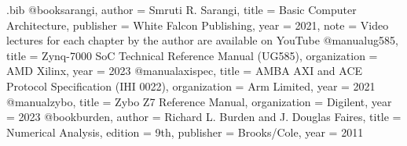 
\begin{filecontents*}[overwrite]{\jobname.bib}
@book{sarangi,
  author    = {Smruti R. Sarangi},
  title     = {Basic Computer Architecture},
  publisher = {White Falcon Publishing},
  year      = {2021},
  note      = {Video lectures for each chapter by the author are available on YouTube}
}
@manual{ug585,
  title        = {Zynq-7000 SoC Technical Reference Manual (UG585)},
  organization = {AMD Xilinx},
  year         = {2023}
}
@manual{axispec,
  title        = {AMBA AXI and ACE Protocol Specification (IHI 0022)},
  organization = {Arm Limited},
  year         = {2021}
}
@manual{zybo,
  title        = {Zybo Z7 Reference Manual},
  organization = {Digilent},
  year         = {2023}
}
@book{burden,
  author    = {Richard L. Burden and J. Douglas Faires},
  title     = {Numerical Analysis},
  edition   = {9th},
  publisher = {Brooks/Cole},
  year      = {2011}
}
\end{filecontents*}

\documentclass[12pt,a4paper,twoside]{article}

\usepackage[a4paper,margin=1in,headheight=15pt]{geometry}
\usepackage[T1]{fontenc}
\usepackage[utf8]{inputenc}
\usepackage{lmodern}
\usepackage{microtype}

\usepackage[table]{xcolor}

